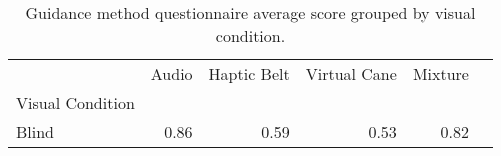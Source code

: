 
\begin{table}[!htb]
\centering
\caption{Guidance method questionnaire average score grouped by visual condition.}
\label{tab:questionnaire_average_group_blind}
\begin{tabular}{lrrrrr}
\toprule
{} & Audio & Haptic Belt & Virtual Cane & Mixture \\
Visual Condition &       &             &              &         \\
\midrule
Blind            &  0.86 &        0.59 &         0.53 &    0.82 \\
\bottomrule
\end{tabular}
\end{table}

